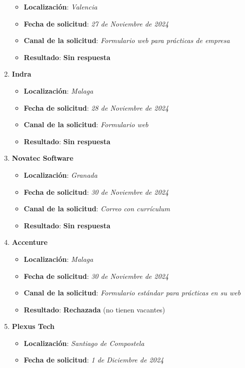\begin{enumerate}
	\begin{itemize}
		\item \textbf{Localización}: \textit{Valencia}
		\item \textbf{Fecha de solicitud}: \textit{27 de Noviembre de 2024}
		\item \textbf{Canal de la solicitud}: \textit{Formulario web para prácticas de empresa}
		\item \textbf{Resultado}: {\color{orange} \textbf{Sin respuesta}}
	\end{itemize}
	\item \textbf{Indra}
	\begin{itemize}
		\item \textbf{Localización}: \textit{Malaga}
		\item \textbf{Fecha de solicitud}: \textit{28 de Noviembre de 2024}
		\item \textbf{Canal de la solicitud}: \textit{Formulario web}
		\item \textbf{Resultado}: {\color{orange} \textbf{Sin respuesta}}
	\end{itemize}
	\item \textbf{Novatec Software}
	\begin{itemize}
		\item \textbf{Localización}: \textit{Granada}
		\item \textbf{Fecha de solicitud}: \textit{30 de Noviembre de 2024}
		\item \textbf{Canal de la solicitud}: \textit{Correo con currículum}
		\item \textbf{Resultado}: {\color{orange} \textbf{Sin respuesta}}
	\end{itemize}
	\item \textbf{Accenture}
	\begin{itemize}
		\item \textbf{Localización}: \textit{Malaga}
		\item \textbf{Fecha de solicitud}: \textit{30 de Noviembre de 2024}
		\item \textbf{Canal de la solicitud}: \textit{Formulario estándar para prácticas en su web}
		\item \textbf{Resultado}: {\color{red} \textbf{Rechazada}} (no tienen vacantes)
	\end{itemize}
		\item \textbf{Plexus Tech}
	\begin{itemize}
		\item \textbf{Localización}: \textit{Santiago de Compostela}
		\item \textbf{Fecha de solicitud}: \textit{1 de Diciembre de 2024}

\end{itemize}
\end{enumerate}
